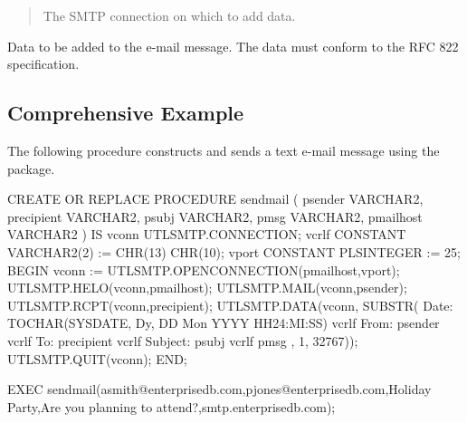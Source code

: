\documentclass[letterpaper,10pt,english,openany,oneside]{sphinxmanual}
\begin{document}

\begin{quote}

The SMTP connection on which to add data.
\end{quote}


Data to be added to the e-mail message. The data must conform to the RFC
822 specification.

\ignorespaces 

\subsection{Comprehensive Example}
\label{\detokenize{utl_smtp:comprehensive-example}}\label{\detokenize{utl_smtp:index-19}}
The following procedure constructs and sends a text e-mail message using
the  package.

%
\begin{sphinxVerbatim}[commandchars=\\\{\}]
CREATE OR REPLACE PROCEDURE send\PYGZus{}mail (
    p\PYGZus{}sender        VARCHAR2,
    p\PYGZus{}recipient     VARCHAR2,
    p\PYGZus{}subj          VARCHAR2,
    p\PYGZus{}msg           VARCHAR2,
    p\PYGZus{}mailhost      VARCHAR2
)
IS
    v\PYGZus{}conn          UTL\PYGZus{}SMTP.CONNECTION;
    v\PYGZus{}crlf          CONSTANT VARCHAR2(2) := CHR(13) \textbar{}\textbar{} CHR(10);
    v\PYGZus{}port          CONSTANT PLS\PYGZus{}INTEGER := 25;
BEGIN
    v\PYGZus{}conn := UTL\PYGZus{}SMTP.OPEN\PYGZus{}CONNECTION(p\PYGZus{}mailhost,v\PYGZus{}port);
    UTL\PYGZus{}SMTP.HELO(v\PYGZus{}conn,p\PYGZus{}mailhost);
    UTL\PYGZus{}SMTP.MAIL(v\PYGZus{}conn,p\PYGZus{}sender);
    UTL\PYGZus{}SMTP.RCPT(v\PYGZus{}conn,p\PYGZus{}recipient);
    UTL\PYGZus{}SMTP.DATA(v\PYGZus{}conn, SUBSTR(
        \PYGZsq{}Date: \PYGZsq{} \textbar{}\textbar{} TO\PYGZus{}CHAR(SYSDATE,
        \PYGZsq{}Dy, DD Mon YYYY HH24:MI:SS\PYGZsq{}) \textbar{}\textbar{} v\PYGZus{}crlf
        \textbar{}\textbar{} \PYGZsq{}From: \PYGZsq{} \textbar{}\textbar{} p\PYGZus{}sender \textbar{}\textbar{} v\PYGZus{}crlf
        \textbar{}\textbar{} \PYGZsq{}To: \PYGZsq{} \textbar{}\textbar{} p\PYGZus{}recipient \textbar{}\textbar{} v\PYGZus{}crlf
        \textbar{}\textbar{} \PYGZsq{}Subject: \PYGZsq{} \textbar{}\textbar{} p\PYGZus{}subj \textbar{}\textbar{} v\PYGZus{}crlf
        \textbar{}\textbar{} p\PYGZus{}msg
        , 1, 32767));
    UTL\PYGZus{}SMTP.QUIT(v\PYGZus{}conn);
END;

EXEC send\PYGZus{}mail(\PYGZsq{}asmith@enterprisedb.com\PYGZsq{},\PYGZsq{}pjones@enterprisedb.com\PYGZsq{},\PYGZsq{}Holiday Party\PYGZsq{},\PYGZsq{}Are you planning to attend?\PYGZsq{},\PYGZsq{}smtp.enterprisedb.com\PYGZsq{});
\end{sphinxVerbatim}
\end{document}
